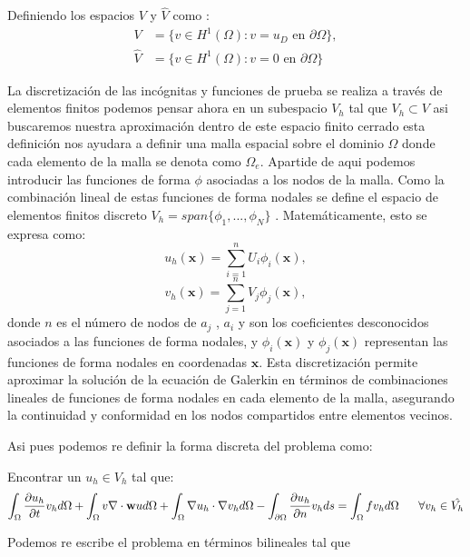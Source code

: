 \documentclass[11pt, spanish]{article}
\begin{document}
Definiendo los espacios $V$ y $\hat{V}$ como : 
\begin{align}
	V      &= \{v \in H^1(\Omega) : v =u_D  \mbox{ en } \partial\Omega\}, \\ 
	\hat{V} &= \{v \in H^1(\Omega) : v = 0 \mbox{ en } \partial\Omega\}
\end{align}

La discretizaci\'on de las inc\'ognitas y funciones de prueba se realiza a trav\'es de elementos finitos podemos pensar ahora en un subespacio $V_h$ tal que $V_h \subset   V$ asi buscaremos nuestra aproximaci\'on dentro de este espacio finito cerrado esta definici\'on nos ayudara a definir una malla espacial sobre el dominio  $\Omega$ donde   cada elemento de la malla se denota como $\Omega_e$. Apartide de aqui podemos introducir las funciones de forma $\phi$ asociadas a los nodos de la malla. Como la combinaci\'on lineal de estas funciones de forma nodales se define el espacio de elementos finitos discreto $V_h=span\{\phi_1, ... , \phi_N\}$ .  Matem\'aticamente, esto se expresa como:
\begin{equation}
    u_h(\boldsymbol{x}) = \sum_{i=1}^{n} U_i \phi_i(\boldsymbol{x}),
\end{equation}
\begin{equation}
    v_h(\boldsymbol{x}) = \sum_{j=1}^{n} V_j \phi_j(\boldsymbol{x}),
\end{equation}
donde $n$ es el n\'umero de nodos de $a_j$ , $a_i$ y  son los coeficientes desconocidos asociados a las funciones de forma nodales, y $\phi_i(\boldsymbol{x})$ y $\phi_j(\boldsymbol{x})$ representan las funciones de forma nodales en coordenadas $\boldsymbol{x}$. Esta discretizaci\'on permite aproximar la soluci\'on de la ecuaci\'on de Galerkin en t\'erminos de combinaciones lineales de funciones de forma nodales en cada elemento de la malla, asegurando la continuidad y conformidad en los nodos compartidos entre elementos vecinos.

Asi pues podemos re definir la forma discreta del problema como:

Encontrar un $u_h \in V_h$ tal que:  
\begin{equation}
	\int_\Omega \frac{\partial u_h}{\partial t}v_h d \Omega + \int_\Omega v \nabla \cdot \mathbf{w}u d \Omega+\int_\Omega\nabla u_h\cdot\nabla v_h d \Omega- \int_{\partial\Omega}{\partial u_h\over
		\partial n}v_h ds = \int_\Omega fv_h d \Omega \ \ \ \ \  \forall v_h \in \hat{V_h}
\end{equation}

Podemos re escribe el problema  en t\'erminos bilineales tal que 
\end{document}
